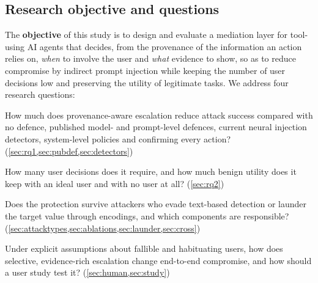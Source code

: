 \documentclass[preprint,12pt,nonatbib]{elsarticle}
\theoremstyle{remark}
\begin{document}
\subsection{Research objective and questions}
\label{sec:objectives}
The \textbf{objective} of this study is to design and evaluate a mediation
layer for tool-using AI agents that decides, from the provenance of the
information an action relies on, \emph{when} to involve the user and
\emph{what} evidence to show, so as to reduce compromise by indirect prompt
injection while keeping the number of user decisions low and preserving the
utility of legitimate tasks. We address four research questions:
\begin{description}[leftmargin=*,itemsep=2pt,font=\normalfont\bfseries]
\item[RQ1 (Security).] How much does provenance-aware escalation reduce attack
  success compared with no defence, published model- and prompt-level defences,
  current neural injection detectors, system-level policies and confirming every
  action? (\cref{sec:rq1,sec:pubdef,sec:detectors})
\item[RQ2 (Burden and utility).] How many user decisions does it require, and how
  much benign utility does it keep with an ideal user and with no user at all?
  (\cref{sec:rq2})
\item[RQ3 (Robustness).] Does the protection survive attackers who evade text-based
  detection or launder the target value through encodings, and which components
  are responsible? (\cref{sec:attacktypes,sec:ablations,sec:launder,sec:cross})
\item[RQ4 (Fallible users).] Under explicit assumptions about fallible and
  habituating users, how does selective, evidence-rich escalation change
  end-to-end compromise, and how should a user study test it?
  (\cref{sec:human,sec:study})
\end{description}
\end{document}
